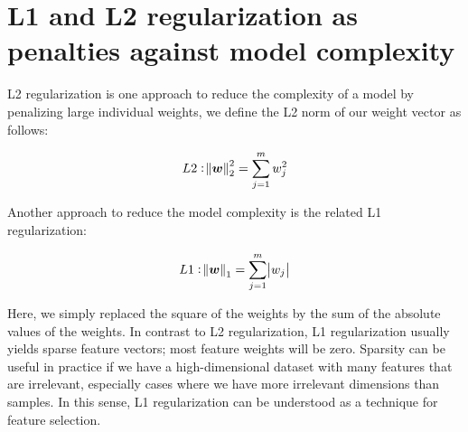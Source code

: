 \documentclass[11pt]{article}
\newcommand{\vect}[1]{\boldsymbol{#1}}
\begin{document}
    \section{L1 and L2 regularization as penalties against model complexity} \label{sec:l1_l2_regularization}

    L2 regularization is one approach to reduce the complexity of a model by penalizing large individual weights, we define the L2 norm of our weight vector \vect{w} as follows:

    \begin{equation} \label{eq:l2_regularization}
        L2: \norm{\vect{w}}_2^2 = \sum \limits_{j=1}^m w_j^2
    \end{equation}

    Another approach to reduce the model complexity is the related L1 regularization:

    \begin{equation}
        L1: \norm{\vect{w}}_1 = \sum \limits_{j=1}^m \abs{w_j}
    \end{equation}

    Here, we simply replaced the square of the weights by the sum of the absolute values of the weights.
    In contrast to L2 regularization, L1 regularization usually yields sparse feature vectors;
    most feature weights will be zero.
    Sparsity can be useful in practice if we have a high-dimensional dataset with many features that are irrelevant, especially cases where we have more irrelevant dimensions than samples.
    In this sense, L1 regularization can be understood as a technique for feature selection.

    
    
\end{document}
